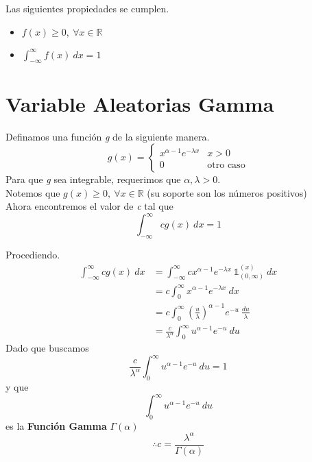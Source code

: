 Las siguientes propiedades se cumplen.
\begin{itemize}
  \item $f(x) \ge 0,~ \forall x \in \mathbb R$
  \item $\int_{-\infty}^{\infty} f(x)~dx = 1$
\end{itemize}



\section{Variable Aleatorias Gamma}

Definamos una función \textit{g} de la siguiente manera.
\[g(x) = 
  \begin{cases}
    x^{\alpha - 1}e^{-\lambda x} & x > 0\\
    0 & \text{otro caso}
  \end{cases}
\]
Para que \textit{g} sea integrable, requerimos que $\alpha, \lambda > 0$.\\
Notemos que $g(x) \ge 0,~ \forall x \in \mathbb R$ (su soporte son los números positivos)\\
Ahora encontremos el valor de \textit{c} tal que
\[\int_{-\infty}^{\infty}cg(x)~dx = 1\]

Procediendo.
\begin{align*}
  \int_{-\infty}^{\infty}cg(x)~dx &= \int_{-\infty}^{\infty}c x^{\alpha -1}e^{-\lambda x} ~ \mathbb 1_{(0, \infty)}^{(x)} ~dx\\
                                  &= c\int_0^{\infty} x^{\alpha -1}e^{-\lambda x} ~dx\\
                                  &= c\int_0^{\infty}(\frac  u\lambda)^{\alpha-1}e^{-u}~ \frac{du}\lambda \\
                                  &= \frac c{\lambda^\alpha} \int_0^{\infty} u^{\alpha - 1}e^{-u}~du
\end{align*}
Dado que buscamos 
\[\frac c{\lambda^\alpha} \int_0^{\infty} u^{\alpha - 1}e^{-u}~du = 1\] y que 
\[\int_0^{\infty} u^{\alpha - 1}e^{-u}~du\] es la \textbf{Función Gamma} $\Gamma(\alpha)$
\[\boxed{\therefore c = \frac{\lambda^\alpha}{\Gamma(\alpha)}}\]


